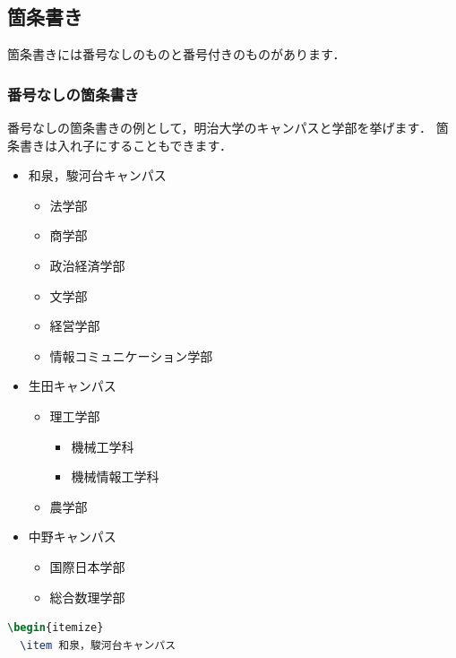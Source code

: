 \documentclass[
    paper=a4paper,      %
    article,            %
    fontsize=11pt,      %
    jafontsize=11pt,    %
    head_space=25mm,    %
    foot_space=25mm,    %
    gutter=20mm,        %
    fore-edge=20mm      %
    ]{jlreq}            %
\begin{document}
\clearpage

\subsection{箇条書き}
\label{ssec:list}

箇条書きには番号なしのものと番号付きのものがあります．

\subsubsection{番号なしの箇条書き}
\label{sssec:itemize}

番号なしの箇条書きの例として，明治大学のキャンパスと学部を挙げます．
箇条書きは入れ子にすることもできます．

\begin{multicols}{2}
  \begin{itemize}
    \item 和泉，駿河台キャンパス
    \begin{itemize}
      \item 法学部
      \item 商学部
      \item 政治経済学部
      \item 文学部
      \item 経営学部
      \item 情報コミュニケーション学部
    \end{itemize}
    \item 生田キャンパス
    \begin{itemize}
      \item 理工学部
      \begin{itemize}
        \item 機械工学科
        \item 機械情報工学科
      \end{itemize}
      \item 農学部
    \end{itemize}
    \item 中野キャンパス
    \begin{itemize}
      \item 国際日本学部
      \item 総合数理学部
    \end{itemize}
  \end{itemize}
  \columnbreak
\begin{lstlisting}[language=TeX]
\begin{itemize}
  \item 和泉，駿河台キャンパス

\end{lstlisting}
\end{multicols}
\end{document}
